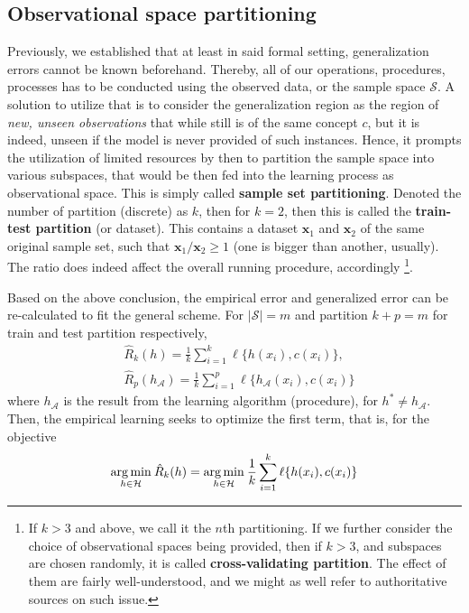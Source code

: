 \subsection{Observational space partitioning}

Previously, we established that at least in said formal setting, generalization errors cannot be known beforehand. Thereby, all of our operations, procedures, processes has to be conducted using the observed data, or the sample space $\mathcal{S}$. A solution to utilize that is to consider the generalization region as the region of \textit{new, unseen observations} that while still is of the same concept $c$, but it is indeed, unseen if the model is never provided of such instances. Hence, it prompts the utilization of limited resources by then to partition the sample space into various subspaces, that would be then fed into the learning process as observational space. This is simply called \textbf{sample set partitioning}. Denoted the number of partition (discrete) as $k$, then for $k=2$, then this is called the \textbf{train-test partition} (or dataset). This contains a dataset $\mathbf{x}_{1}$ and $\mathbf{x}_{2}$ of the same original sample set, such that $\mathbf{x}_{1}/\mathbf{x}_{2}\geq 1$ (one is bigger than another, usually). The ratio does indeed affect the overall running procedure, accordingly \footnote{If $k>3$ and above, we call it the $n$th partitioning. If we further consider the choice of observational spaces being provided, then if $k>3$, and subspaces are chosen randomly, it is called \textbf{cross-validating partition}. The effect of them are fairly well-understood, and we might as well refer to authoritative sources on such issue.}.



Based on the above conclusion, the empirical error and generalized error can be re-calculated to fit the general scheme. For $\lvert \mathcal{S}\rvert = m$ and partition $k+p=m$ for train and test partition respectively, 
\begin{align}
    &\hat{R}_{k}(h) = \frac{1}{k} \sum^{k}_{i=1} \ell\{h(x_{i}),c(x_{i})\},\\
    &\hat{R}_{p}(h_{\mathcal{A}}) = \frac{1}{k} \sum^{p}_{i=1} \ell\{h_{\mathcal{A}}(x_{i}),c(x_{i})\}
\end{align}
where $h_{\mathcal{A}}$ is the result from the learning algorithm (procedure), for $h^{*}\neq h_{\mathcal{A}}$. Then, the empirical learning seeks to optimize the first term, that is, for the objective 
\begin{equation}
    \underset{h\in \mathcal{H}}{\operatorname*{arg\,min}}\: \hat{R}_{k}(h) = \underset{h\in \mathcal{H}}{\operatorname*{arg\,min}}\:\frac{1}{k} \sum^{k}_{i=1} \ell\{h(x_{i}),c(x_{i})\}
\end{equation}

